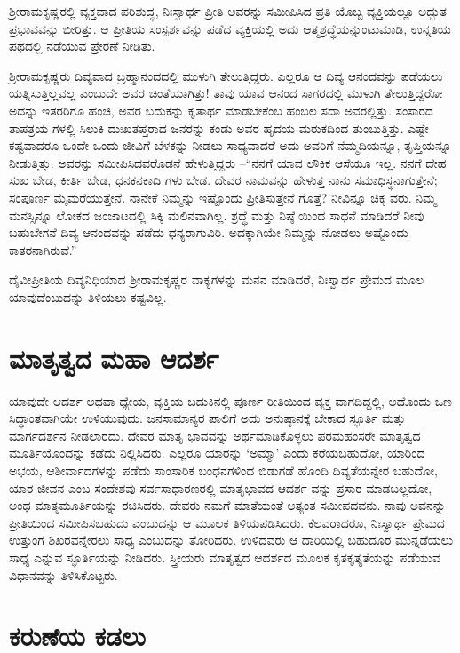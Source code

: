 ಶ‍್ರೀರಾಮಕೃಷ್ಣರಲ್ಲಿ ವ್ಯಕ್ತವಾದ ಪರಿಶುದ್ಧ, ನಿಃಸ್ವಾರ್ಥ ಪ್ರೀತಿ ಅವರನ್ನು ಸಮೀಪಿಸಿದ ಪ್ರತಿ ಯೊಬ್ಬ ವ್ಯಕ್ತಿಯಲ್ಲೂ ಅದ್ಭುತ ಪ್ರಭಾವವನ್ನು ಬೀರಿತ್ತು. ಆ ಪ್ರೀತಿಯ ಸಂಸ್ಪರ್ಶವನ್ನು ಪಡೆದ ವ್ಯಕ್ತಿಯಲ್ಲಿ ಅದು ಆತ್ಮಶ್ರದ್ಧೆಯನ್ನುಂಟುಮಾಡಿ, ಉನ್ನತಿಯ ಪಥದಲ್ಲಿ ನಡೆಯುವ ಪ್ರೇರಣೆ ನೀಡಿತು.

ಶ‍್ರೀರಾಮಕೃಷ್ಣರು ದಿವ್ಯವಾದ ಬ್ರಹ್ಮಾನಂದದಲ್ಲಿ ಮುಳುಗಿ ತೇಲುತ್ತಿದ್ದರು. ಎಲ್ಲರೂ ಆ ದಿವ್ಯ ಆನಂದವನ್ನು ಪಡೆಯಲು ಯತ್ನಿಸುತ್ತಿಲ್ಲವಲ್ಲ ಎಂಬುದೇ ಅವರ ಚಿಂತೆಯಾಗಿತ್ತು! ತಾವು ಯಾವ ಆನಂದ ಸಾಗರದಲ್ಲಿ ಮುಳುಗಿ ತೇಲುತ್ತಿದ್ದರೋ ಅದನ್ನು ಇತರರಿಗೂ ಹಂಚಿ, ಅವರ ಬದುಕನ್ನು ಕೃತಾರ್ಥ ಮಾಡಬೇಕೆಂಬ ಹಂಬಲ ಸದಾ ಅವರಲ್ಲಿತ್ತು. ಸಂಸಾರದ ತಾಪತ್ರಯ ಗಳಲ್ಲಿ ಸಿಲುಕಿ ದುಃಖತಪ್ತರಾದ ಜನರನ್ನು ಕಂಡು ಅವರ ಹೃದಯ ಮರುಕದಿಂದ ತುಂಬುತ್ತಿತ್ತು. ಎಷ್ಟೇ ಕಷ್ಟವಾದರೂ ಒಂದೇ ಒಂದು ಜೀವಿಗೆ ಬೆಳಕನ್ನು ನೀಡಲು ಸಾಧ್ಯವಾದರೆ ಅದು ಅವರಿಗೆ ನೆಮ್ಮದಿಯನ್ನೂ, ತೃಪ್ತಿಯನ್ನೂ ನೀಡುತ್ತಿತ್ತು. ಅವರನ್ನು ಸಮೀಪಿಸಿದವರೊಡನೆ ಹೇಳುತ್ತಿದ್ದರು –“ನನಗೆ ಯಾವ ಲೌಕಿಕ ಆಸೆಯೂ ಇಲ್ಲ. ನನಗೆ ದೇಹ ಸುಖ ಬೇಡ, ಕೀರ್ತಿ ಬೇಡ, ಧನಕನಕಾದಿ ಗಳು ಬೇಡ. ದೇವರ ನಾಮವನ್ನು ಹೇಳುತ್ತ ನಾನು ಸಮಾಧಿಸ್ಥನಾಗುತ್ತೇನೆ; ಸಂಪೂರ್ಣ ಮೈಮರೆಯುತ್ತೇನೆ. ನಾನೇಕೆ ನಿಮ್ಮನ್ನು ಇಷ್ಟೊಂದು ಪ್ರೀತಿಸುತ್ತೇನೆ ಗೊತ್ತೆ? ನೀವಿನ್ನೂ ಚಿಕ್ಕ ವರು. ನಿಮ್ಮ ಮನಸ್ಸಿನ್ನೂ ಲೋಕದ ಜಂಜಾಟದಲ್ಲಿ ಸಿಕ್ಕಿ ಮಲಿನವಾಗಿಲ್ಲ. ಶ್ರದ್ಧೆ ಮತ್ತು ನಿಷ್ಠೆ ಯಿಂದ ಸಾಧನೆ ಮಾಡಿದರೆ ನೀವು ಬಹುಬೇಗನೆ ದಿವ್ಯ ಆನಂದವನ್ನು ಪಡೆದು ಧನ್ಯರಾಗುವಿರಿ. ಅದಕ್ಕಾಗಿಯೇ ನಿಮ್ಮನ್ನು ನೋಡಲು ಅಷ್ಟೊಂದು ಕಾತರನಾಗಿರುವೆ.”

ದೈವೀಪ್ರೀತಿಯ ದಿವ್ಯನಿಧಿಯಾದ ಶ‍್ರೀರಾಮಕೃಷ್ಣರ ವಾಕ್ಯಗಳನ್ನು ಮನನ ಮಾಡಿದರೆ, ನಿಃಸ್ವಾರ್ಥ ಪ್ರೇಮದ ಮೂಲ ಯಾವುದೆಂಬುದನ್ನು ತಿಳಿಯಲು ಕಷ್ಟವಿಲ್ಲ.


\section{ಮಾತೃತ್ವದ ಮಹಾ ಆದರ್ಶ}

ಯಾವುದೇ ಆದರ್ಶ ಅಥವಾ ಧ್ಯೇಯ, ವ್ಯಕ್ತಿಯ ಬದುಕಿನಲ್ಲಿ ಪೂರ್ಣ ರೀತಿಯಿಂದ ವ್ಯಕ್ತ ವಾಗದಿದ್ದಲ್ಲಿ, ಅದೊಂದು ಒಣ ಸಿದ್ಧಾಂತವಾಗಿಯೇ ಉಳಿಯುವುದು. ಜನಸಾಮಾನ್ಯರ ಪಾಲಿಗೆ ಅದು ಅನುಷ್ಠಾನಕ್ಕೆ ಬೇಕಾದ ಸ್ಫೂರ್ತಿ ಮತ್ತು ಮಾರ್ಗದರ್ಶನ ನೀಡಲಾರದು. ದೇವರ ಮಾತೃ ಭಾವವನ್ನು ಅರ್ಥಮಾಡಿಕೊಳ್ಳಲು ಪರಮಹಂಸರೇ ಮಾತೃತ್ವದ ಮೂರ್ತಿಯೊಂದನ್ನು ಕಡೆದು ನಿಲ್ಲಿಸಿದರು. ಎಲ್ಲರೂ ಯಾರನ್ನು ‘ಅಮ್ಮಾ’ ಎಂದು ಕರೆಯಬಹುದೋ, ಯಾರಿಂದ ಅಭಯ, ಆಶೀರ್ವಾದಗಳನ್ನು ಪಡೆದು ಸಾಂಸಾರಿಕ ಬಂಧನಗಳಿಂದ ಬಿಡುಗಡೆ ಹೊಂದಿ ದಿವ್ಯತೆಯನ್ನೇರ ಬಹುದೋ, ಯಾರ ಜೀವನ ಎಂಬ ಸಂದೇಶವು ಸರ್ವಸಾಧಾರಣರಲ್ಲಿ ಮಾತೃಭಾವದ ಆದರ್ಶ ವನ್ನು ಪ್ರಸಾರ ಮಾಡಬಲ್ಲದೋ, ಅಂಥ ಮಾತೃಮೂರ್ತಿಯನ್ನು ರಚಿಸಿದರು. ದೇವರು ನಮಗೆ ಮಾತೆಯಂತೆ ಅತ್ಯಂತ ಸಮೀಪದವನು. ನಾವು ಅವನನ್ನು ಪ್ರೀತಿಯಿಂದ ಸಮೀಪಿಸಬಹುದು ಎಂಬುದನ್ನು ಆ ಮೂಲಕ ತಿಳಿಯಪಡಿಸಿದರು. ಕೆಲವರಾದರೂ, ನಿಃಸ್ವಾರ್ಥ ಪ್ರೇಮದ ಉತ್ತುಂಗ ಶಿಖರವನ್ನೇರಲು ಸಾಧ್ಯ ಎಂಬುದನ್ನು ತೋರಿದರು. ಉಳಿದವರು ಆ ದಾರಿಯಲ್ಲಿ ಬಹುದೂರ ಮುನ್ನಡೆಯಲು ಸಾಧ್ಯ ಎನ್ನುವ ಸ್ಫೂರ್ತಿಯನ್ನು ನೀಡಿದರು. ಸ್ತ್ರೀಯರು ಮಾತೃತ್ವದ ಆದರ್ಶದ ಮೂಲಕ ಕೃತಕೃತ್ಯತೆಯನ್ನು ಪಡೆಯುವ ವಿಧಾನವನ್ನು ತಿಳಿಸಿಕೊಟ್ಟರು.


\section{ಕರುಣೆಯ ಕಡಲು}

